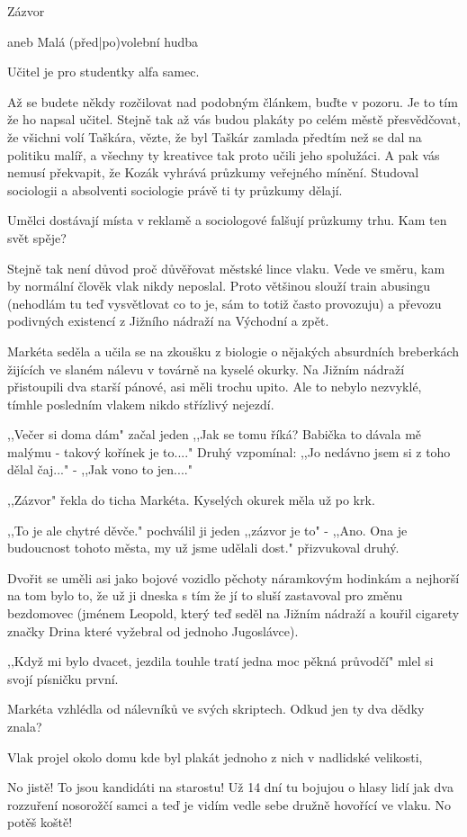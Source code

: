 Zázvor

aneb Malá (před|po)volební hudba

Učitel je pro studentky alfa samec.

Až se budete někdy rozčilovat nad podobným článkem, buďte v pozoru. Je to tím že ho napsal učitel. Stejně tak až vás budou plakáty po celém městě přesvědčovat, že  všichni volí Taškára, vězte, že byl Taškár zamlada předtím než se dal na politiku malíř, a všechny ty kreativce tak proto učili jeho spolužáci. A pak vás nemusí překvapit, že Kozák vyhrává průzkumy veřejného mínění. Studoval sociologii a absolventi sociologie právě ti ty průzkumy dělají.

Umělci dostávají místa v reklamě a sociologové falšují průzkumy trhu. Kam ten svět spěje?

Stejně tak není důvod proč důvěřovat městské lince vlaku. Vede ve směru, kam by normální člověk vlak nikdy neposlal. Proto většinou slouží train abusingu (nehodlám tu teď vysvětlovat co to je, sám to totiž často provozuju) a převozu podivných existencí z Jižního nádraží na Východní a zpět.

Markéta seděla a učila se na zkoušku z biologie o nějakých absurdních breberkách žijících ve slaném nálevu v továrně na kyselé okurky. Na Jižním nádraží přistoupili dva starší pánové, asi měli trochu upito. Ale to nebylo nezvyklé, tímhle posledním vlakem nikdo střízlivý nejezdí.

,,Večer si doma dám" začal jeden ,,Jak se tomu říká? Babička to dávala mě malýmu - takový kořínek je to...." Druhý vzpomínal: ,,Jo nedávno jsem si z toho dělal čaj..." - ,,Jak vono to jen...."

,,Zázvor" řekla do ticha Markéta. Kyselých okurek měla už po krk.

,,To je ale chytré děvče." pochválil ji jeden ,,zázvor je to" - ,,Ano. Ona je budoucnost tohoto města, my už jsme udělali dost." přizvukoval druhý.

Dvořit se uměli asi jako bojové vozidlo pěchoty náramkovým hodinkám a nejhorší na tom bylo to, že už ji dneska s tím že jí to sluší zastavoval pro změnu bezdomovec (jménem Leopold, který teď seděl na Jižním nádraží a kouřil cigarety značky Drina které vyžebral od jednoho Jugoslávce).

,,Když mi bylo dvacet, jezdila touhle tratí jedna moc pěkná průvodčí" mlel si svojí písničku první.

Markéta vzhlédla od nálevníků ve svých skriptech. Odkud jen ty dva dědky znala?

Vlak projel okolo domu kde byl plakát jednoho z nich v nadlidské velikosti,

No jistě! To jsou kandidáti na starostu! Už 14 dní tu bojujou o hlasy lidí jak dva rozzuření nosorožčí samci a teď je vidím vedle sebe družně hovořící ve vlaku. No potěš koště!
